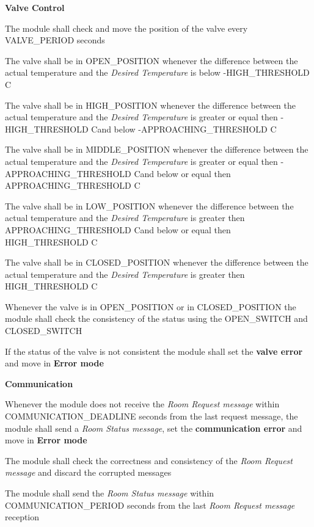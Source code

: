 \begin{req_enum}
					
				\item \textbf{Valve Control}
					\begin{req_enum}[label*=\arabic*.]
						\item The module shall check and move the position of the valve every VALVE\_PERIOD seconds
						\item The valve shall be in OPEN\_POSITION whenever the difference between the actual temperature and the \textit{Desired Temperature} is below -HIGH\_THRESHOLD C\degree
						\item The valve shall be in HIGH\_POSITION whenever the difference between the actual temperature and the \textit{Desired Temperature} is greater or equal then -HIGH\_THRESHOLD C\degree and below -APPROACHING\_THRESHOLD C\degree
						\item The valve shall be in MIDDLE\_POSITION whenever the difference between the actual temperature and the \textit{Desired Temperature} is greater or equal then -APPROACHING\_THRESHOLD C\degree and below or equal then APPROACHING\_THRESHOLD C\degree
						\item The valve shall be in LOW\_POSITION whenever the difference between the actual temperature and the \textit{Desired Temperature} is greater then APPROACHING\_THRESHOLD C\degree and below or equal then HIGH\_THRESHOLD C\degree
						\item The valve shall be in CLOSED\_POSITION whenever the difference between the actual temperature and the \textit{Desired Temperature} is greater then HIGH\_THRESHOLD C\degree
						\item Whenever the valve is in OPEN\_POSITION or in CLOSED\_POSITION the module shall check the consistency of the status using the OPEN\_SWITCH and CLOSED\_SWITCH
						\item If the status of the valve is not consistent the module shall set the \textbf{valve error} and move in \textbf{Error mode}
					\end{req_enum}

			\item \textbf{Communication}
			\begin{req_enum}[label*=\arabic*.]
				\item Whenever the module does not receive the \textit{Room Request message} within COMMUNICATION\_DEADLINE seconds from the last request message, the module shall send a \textit{Room Status message}, set the \textbf{communication error} and move in \textbf{Error mode}
				\item The module shall check the correctness and consistency of the \textit{Room Request message} and discard the corrupted messages
				\item The module shall send the \textit{Room Status message} within COMMUNICATION\_PERIOD seconds from the last \textit{Room Request message} reception
			\end{req_enum}

		\end{req_enum}

